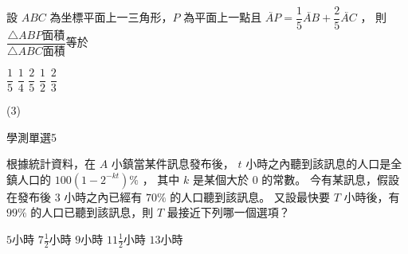 \begin{QUESTIONS}
\begin{QUESTION}
\begin{ExamAnsRateInfo}{49}{69}{47}{31}
        \end{ExamAnsRateInfo}
        \begin{QBODY}
            設 $ABC$ 為坐標平面上一三角形，$P$ 為平面上一點且 $\lvec{AP} = \dfrac{1}{5} \lvec{AB} + \dfrac{2}{5} \lvec{AC}$ ， 則 $\dfrac{\triangle ABP \mbox{面積}}{ \triangle ABC \mbox{面積}}$等於 
            \begin{QOPS}
                \QOP $\dfrac{1}{5}$ 
                \QOP $\dfrac{1}{4}$ 
                \QOP $\dfrac{2}{5}$ 
                \QOP $\dfrac{1}{2}$         
                \QOP $\dfrac{2}{3}$
            \end{QOPS}
        \end{QBODY}
        \begin{QFROMS}
        \end{QFROMS}
        \begin{QTAGS}\end{QTAGS}
        \begin{QANS}
            (3)
        \end{QANS}
        \begin{QSOLLIST}
        \end{QSOLLIST}
        \begin{QEMPTYSPACE}
        \end{QEMPTYSPACE}
    \end{QUESTION}
    \begin{QUESTION}
        \begin{ExamInfo}{92}{學測}{單選}{5}
        \end{ExamInfo}
        \begin{ExamAnsRateInfo}{22}{43}{15}{8}
        \end{ExamAnsRateInfo}
        \begin{QBODY}
            根據統計資料，在  $A$ 小鎮當某件訊息發布後， 
            $t$ 小時之內聽到該訊息的人口是全鎮人口的 $100(1- 2^{-kt})\%$ ，
            其中 $k$ 是某個大於 $0$ 的常數。
            今有某訊息，假設在發布後 $3$ 小時之內已經有 $70\%$ 的人口聽到該訊息。
            又設最快要 $T$ 小時後，有 $99\%$ 的人口已聽到該訊息，則 $T$ 最接近下列哪一個選項？
            \begin{QOPS} 
                \QOP $5$小時        
                \QOP $7\frac{1}{2}$小時
                \QOP $9$小時 
                \QOP $11\frac{1}{2}$小時 
                \QOP $13$小時
            \end{QOPS}
        \end{QBODY}

\end{QUESTION}
\end{QUESTIONS}
